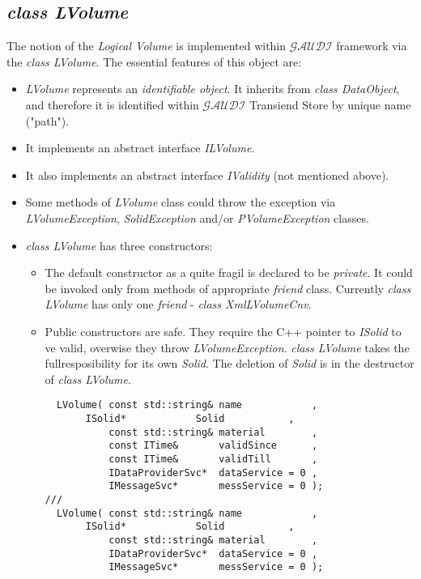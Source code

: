 \subsection { {\it class LVolume} }
The notion of the {\it Logical Volume } is implemented within 
${\mathcal{GAUDI}}$ framework via the {\it class LVolume}. 
The essential features of this object are:
\begin{itemize}
\item {\it LVolume} represents an {\it identifiable object}. 
 It inherits from {\it class DataObject}, and therefore it is 
 identified within ${\mathcal{ GAUDI}}$ Transiend Store by unique name 
("path"). 
\item It implements an abstract interface {\it ILVolume}.  
\item It also implements an abstract interface {\it IValidity} (not mentioned above).   
\item Some methods of {\it LVolume} class could throw 
the exception via {\it LVolumeException}, {\it SolidException} 
and/or            {\it PVolumeException} classes.
\item {\it class LVolume} has three constructors:
 \begin{itemize} 
  \item The default constructor as a quite fragil is declared to be {\it private}. 
  It could be invoked only from methods of appropriate {\it friend } class. 
  Currently {\it class LVolume } has only one {\it friend} - { \it class XmlLVolumeCnv}.
  \item Public constructors are safe. They require the C++ pointer to {\it ISolid} to ve valid, 
        overwise they throw {\it LVolumeException}. {\it class LVolume} takes the fullresposibility 
       for its own {\it Solid}. The deletion of {\it Solid} is in the destructor of
{\it class LVolume}. 
\begin{verbatim}
  LVolume( const std::string& name            , 
	   ISolid*            Solid           ,
           const std::string& material        ,
           const ITime&       validSince      , 
           const ITime&       validTill       , 
           IDataProviderSvc*  dataService = 0 , 
           IMessageSvc*       messService = 0 );
///
  LVolume( const std::string& name            , 
	   ISolid*            Solid           ,
           const std::string& material        ,
           IDataProviderSvc*  dataService = 0 , 
           IMessageSvc*       messService = 0 );
\end{verbatim}
 \end{itemize}  

\end{itemize}
